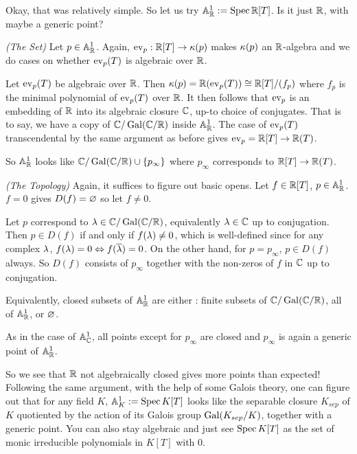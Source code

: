 \begin{eg}
  Okay, that was relatively simple.
  So let us try $\mathbb{A}^1_{\mathbb{R}} := \operatorname{Spec} \mathbb{R}[T]$.
  Is it just $\mathbb{R}$, with maybe a generic point?

  \textit{(The Set)}
  Let $p \in \mathbb{A}^1_{\mathbb{R}}$.
  Again, $\operatorname{ev}_p : \mathbb{R}[T] \to \kappa(p)$ makes $\kappa(p)$ an $\mathbb{R}$-algebra
  and we do cases on whether $\operatorname{ev}_p(T)$ is algebraic over $\mathbb{R}$.

  Let $\operatorname{ev}_p(T)$ be algebraic over $\mathbb{R}$.
  Then $\kappa(p) = \mathbb{R}(\operatorname{ev}_p(T)) \cong \mathbb{R}[T]/(f_p)$ where 
  $f_p$ is the minimal polynomial of $\operatorname{ev}_p(T)$ over $\mathbb{R}$.
  It then follows that $\operatorname{ev}_p$ is an embedding of $\mathbb{R}$ into 
  its algebraic closure $\mathbb{C}$, up-to choice of conjugates. 
  That is to say, we have a copy of 
  $\mathbb{C}/\operatorname{Gal}(\mathbb{C}/\mathbb{R})$ inside $\mathbb{A}^1_{\mathbb{R}}$.
  The case of $\operatorname{ev}_p(T)$ transcendental by the same argument as before 
  gives $\operatorname{ev}_p = \mathbb{R}[T] \to \mathbb{R}(T)$.

  So $\mathbb{A}^1_{\mathbb{R}}$ looks like $\mathbb{C}/\operatorname{Gal}(\mathbb{C}/\mathbb{R}) \cup \left\{p_\infty\right\}$
  where $p_\infty$ corresponds to $\mathbb{R}[T] \to \mathbb{R}(T)$.

  \textit{(The Topology)}
  Again, it suffices to figure out basic opens. 
  Let $f \in \mathbb{R}[T]$, $p \in \mathbb{A}^1_{\mathbb{R}}$.
  $f = 0$ gives $D(f) = \varnothing$ so let $f \neq 0$.

  Let $p$ correspond to $\lambda \in \mathbb{C}/\operatorname{Gal}(\mathbb{C}/\mathbb{R})$,
  equivalently $\lambda \in \mathbb{C}$ up to conjugation.
  Then $p \in D(f)$ if and only if $f(\lambda) \neq 0$,
  which is well-defined since for any complex $\lambda$,
  $f(\lambda) = 0 \Leftrightarrow f(\overline{\lambda}) = 0$.
  On the other hand, for $p = p_\infty$,
  $p \in D(f)$ always. 
  So $D(f)$ consists of $p_\infty$ together with 
  the non-zeros of $f$ in $\mathbb{C}$ up to conjugation.

  Equivalently, closed subsets of $\mathbb{A}^1_{\mathbb{R}}$ are either : 
  finite subsets of $\mathbb{C}/\operatorname{Gal}(\mathbb{C}/\mathbb{R})$, all of $\mathbb{A}^1_{\mathbb{R}}$,
  or $\varnothing$.

  As in the case of $\mathbb{A}^1_{\mathbb{C}}$,
  all points except for $p_\infty$ are closed 
  and $p_\infty$ is again a generic point of $\mathbb{A}^1_{\mathbb{R}}$.

  So we see that $\mathbb{R}$ not algebraically closed gives 
  more points than expected!
  Following the same argument, with the help of some Galois theory,
  one can figure out that for any field $K$,
  $\mathbb{A}^1_K := \operatorname{Spec} K[T]$ looks like 
  the separable closure $K_{sep}$ of $K$ quotiented by 
  the action of its Galois group $\operatorname{Gal}(K_{sep}/K)$,
  together with a generic point. 
  You can also stay algebraic and just see 
  $\operatorname{Spec} K[T]$ as the set of monic irreducible polynomials in $K[T]$
  with $0$. 


\end{eg}
